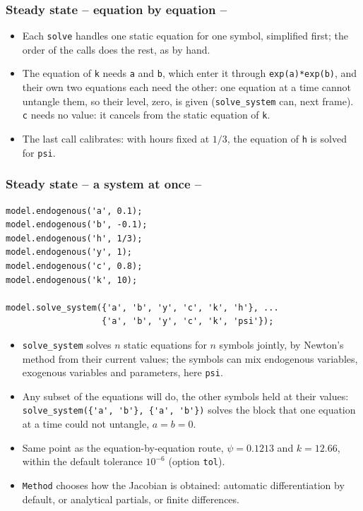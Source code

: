 \documentclass[10pt,slidestop]{beamer}
\theoremstyle{plain}
\begin{document}
\begin{frame}[c,fragile]
  \frametitle{Steady state -- equation by equation --}

  \scalebox{1}{
  }

  \begin{itemize}\small
  \item Each \verb+solve+ handles one static equation for one symbol, simplified
    first; the order of the calls does the rest, as by hand.
  \item The equation of \verb+k+ needs \verb+a+ and \verb+b+, which enter it through
    \verb|exp(a)*exp(b)|, and their own two equations each need the other: one
    equation at a time cannot untangle them, so their level, zero, is given
    (\verb+solve_system+ can, next frame).
    \verb+c+ needs no value: it cancels from the static equation of \verb+k+.
  \item The last call calibrates: with hours fixed at $1/3$, the equation of
    \verb+h+ is solved for \verb+psi+.
  \end{itemize}

\end{frame}


\begin{frame}[fragile]
  \frametitle{Steady state -- a system at once --}

  \begin{lstlisting}[style=MatlabConsole,basicstyle=\ttfamily\scriptsize]
% rough starting values; h holds its target, 1/3
model.endogenous('a', 0.1);
model.endogenous('b', -0.1);
model.endogenous('h', 1/3);
model.endogenous('y', 1);
model.endogenous('c', 0.8);
model.endogenous('k', 10);

model.solve_system({'a', 'b', 'y', 'c', 'k', 'h'}, ...
                   {'a', 'b', 'y', 'c', 'k', 'psi'});
  \end{lstlisting}

  \begin{itemize}\small
  \item \verb+solve_system+ solves $n$ static equations for $n$ symbols jointly, by
    Newton's method from their current values; the symbols can mix endogenous
    variables, exogenous variables and parameters, here \verb+psi+.
  \item Any subset of the equations will do, the other symbols held at their
    values: \verb+solve_system({'a', 'b'}, {'a', 'b'})+ solves the block that one
    equation at a time could not untangle, $a = b = 0$.
  \item Same point as the equation-by-equation route, $\psi = 0.1213$ and
    $k = 12.66$, within the default tolerance $10^{-6}$ (option \verb+tol+).
  \item \verb+Method+ chooses how the Jacobian is obtained: automatic
    differentiation by default, or analytical partials, or finite differences.
  \end{itemize}

\end{frame}
\end{document}
